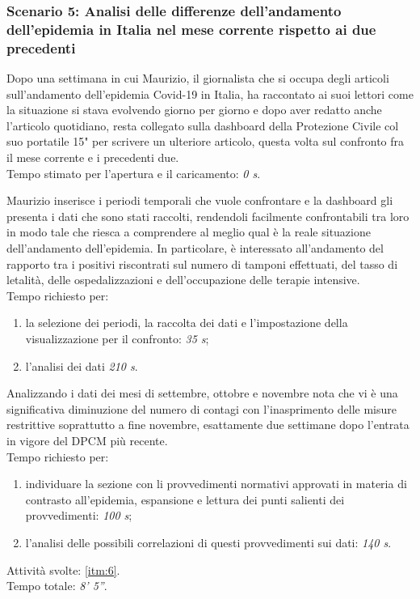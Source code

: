 \subsubsection*{Scenario 5: Analisi delle differenze dell'andamento dell'epidemia in Italia nel mese corrente rispetto ai due precedenti}
Dopo una settimana in cui Maurizio, il giornalista che si occupa degli articoli sull'andamento dell'epidemia Covid-19 in Italia, ha raccontato ai suoi lettori come la situazione si stava evolvendo giorno per giorno e dopo aver redatto anche l'articolo quotidiano, resta collegato sulla dashboard della Protezione Civile col suo portatile 15" per scrivere un ulteriore articolo, questa volta sul confronto fra il mese corrente e i precedenti due.\\
Tempo stimato per l'apertura e il caricamento: \textit{0 s}.

Maurizio inserisce i periodi temporali che vuole confrontare e la dashboard gli presenta i dati che sono stati raccolti, rendendoli facilmente confrontabili tra loro in modo tale che riesca a comprendere al meglio qual è la reale situazione dell’andamento dell’epidemia. In particolare, è interessato all'andamento del rapporto tra i positivi riscontrati sul numero di tamponi effettuati, del tasso di letalità, delle ospedalizzazioni e dell'occupazione delle terapie intensive.\\
Tempo richiesto per:
\begin{enumerate}
    \item la selezione dei periodi, la raccolta dei dati e l'impostazione della visualizzazione per il confronto: \textit{35 s};
    \item l'analisi dei dati \textit{210 s}.
\end{enumerate}

Analizzando i dati dei mesi di settembre, ottobre e novembre nota che vi è una significativa diminuzione del numero di contagi con l'inasprimento delle misure restrittive soprattutto a fine novembre, esattamente due settimane dopo l'entrata in vigore del DPCM più recente.\\
Tempo richiesto per:
\begin{enumerate}
    \item individuare la sezione con li provvedimenti normativi approvati in materia di contrasto all'epidemia, espansione e lettura dei punti salienti dei provvedimenti: \textit{100 s};
    \item l'analisi delle possibili correlazioni di questi provvedimenti sui dati: \textit{140 s}.
\end{enumerate}
\noindent
Attività svolte: \ref{itm:6}.\\ 
Tempo totale: \textit{8' 5''}. 

